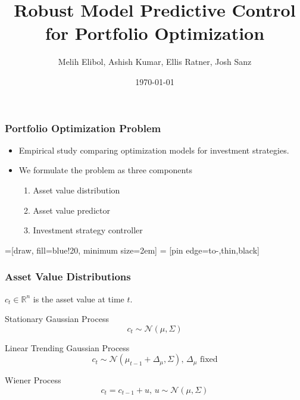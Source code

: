\documentclass{beamer}
\title[Robust MPC for Portfolio Optimization]{Robust Model Predictive Control for Portfolio Optimization} %
\author[M. Elibol, A. Kumar, E. Ratner, J. Sanz]{Melih Elibol, Ashish Kumar, Ellis Ratner, Josh Sanz} %
\institute[] %
{
\medskip
}
\date{\today} %
\begin{document}
\begin{frame}
\titlepage %
\end{frame}

\begin{frame}
\frametitle{Portfolio Optimization Problem}

    \begin{itemize}
    \item Empirical study comparing optimization models for investment strategies.
    \item We formulate the problem as three components
        \begin{enumerate}
        \item Asset value distribution

        \item Asset value predictor

        \item Investment strategy controller
        \end{enumerate}
    \end{itemize}

    =[draw, fill=blue!20, minimum size=2em]
 = [pin edge={to-,thin,black}]

\begin{figure}
\centering
{}
\end{figure}

\end{frame}

\begin{frame}
\frametitle{Asset Value Distributions}
    $c_t \in \mathbb{R}^n$ is the asset value at time $t$.
    \begin{block}{Stationary Gaussian Process}
        \[ c_t \sim \mathcal{N}\left(\mu, \Sigma \right) \]
    \end{block}
    \begin{block}{Linear Trending Gaussian Process}
        \[ c_t \sim \mathcal{N}\left(\mu_{t-1} + \Delta_\mu, \Sigma \right), \, \Delta_\mu \mbox{ fixed}\]
    \end{block}
    \begin{block}{Wiener Process}
        \[ c_t = c_{t-1} + u,\, u \sim \mathcal{N}\left(\mu, \Sigma \right) \]
    \end{block}

\end{frame}
\end{document}
